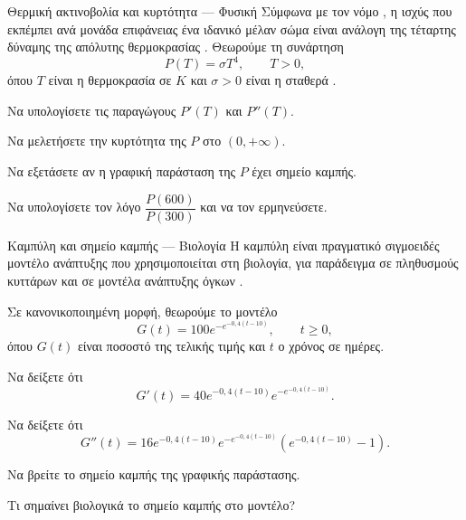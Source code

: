 \begin{problhma}{Θερμική ακτινοβολία και κυρτότητα --- Φυσική}
Σύμφωνα με τον νόμο , η ισχύς που εκπέμπει ανά
μονάδα επιφάνειας ένα ιδανικό μέλαν σώμα είναι ανάλογη της τέταρτης
δύναμης της απόλυτης θερμοκρασίας \cite{openstaxCollegePhysicsRadiation}.
Θεωρούμε τη συνάρτηση
\[
  P(T)=\sigma T^4,\qquad T>0,
\]
όπου \(T\) είναι η θερμοκρασία σε \(\si{K}\) και
\(\sigma>0\) είναι η σταθερά .
\begin{alist}
  \item Να υπολογίσετε τις παραγώγους \(P'(T)\) και \(P''(T)\).
  \item Να μελετήσετε την κυρτότητα της \(P\) στο \((0,+\infty)\).
  \item Να εξετάσετε αν η γραφική παράσταση της \(P\) έχει σημείο
        καμπής.
  \item Να υπολογίσετε τον λόγο \(\dfrac{P(600)}{P(300)}\) και να τον
        ερμηνεύσετε.
\end{alist}
\end{problhma}

\begin{problhma}{Καμπύλη  και σημείο καμπής --- Βιολογία}
Η καμπύλη  είναι πραγματικό σιγμοειδές μοντέλο ανάπτυξης
που χρησιμοποιείται στη βιολογία, για παράδειγμα σε πληθυσμούς κυττάρων
και σε μοντέλα ανάπτυξης όγκων \cite{gompertzFunctionGrowth}.

Σε κανονικοποιημένη μορφή, θεωρούμε το μοντέλο
\[
  G(t)=100e^{-e^{-0{,}4(t-10)}},
  \qquad t\geq0,
\]
όπου \(G(t)\) είναι ποσοστό της τελικής τιμής και \(t\) ο χρόνος σε
ημέρες.
\begin{alist}
  \item Να δείξετε ότι
        \[
          G'(t)=40e^{-0{,}4(t-10)}e^{-e^{-0{,}4(t-10)}}.
        \]
  \item Να δείξετε ότι
        \[
          G''(t)=16e^{-0{,}4(t-10)}e^{-e^{-0{,}4(t-10)}}
          \left(e^{-0{,}4(t-10)}-1\right).
        \]
  \item Να βρείτε το σημείο καμπής της γραφικής παράστασης.
  \item Τι σημαίνει βιολογικά το σημείο καμπής στο μοντέλο?
\end{alist}
\end{problhma}

